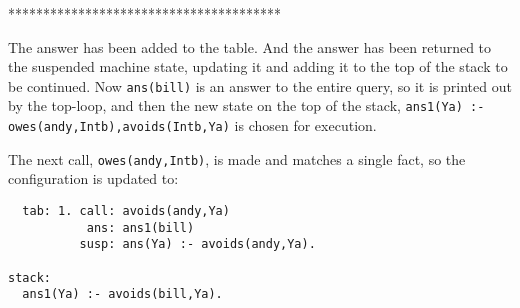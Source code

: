 ***************************************


The answer has been added to the table.  And the answer has been
returned to the suspended machine state, updating it and adding it to
the top of the stack to be continued.  Now \verb|ans(bill)| is an
answer to the entire query, so it is printed out by the top-loop, and
then the new state on the top of the stack,
\verb|ans1(Ya) :- owes(andy,Intb),avoids(Intb,Ya)|
is chosen for execution.

The next call, \verb|owes(andy,Intb)|, is made and matches a single
fact, so the configuration is updated to:
\begin{verbatim}
  tab: 1. call: avoids(andy,Ya)
           ans: ans1(bill)
          susp: ans(Ya) :- avoids(andy,Ya).

stack:
  ans1(Ya) :- avoids(bill,Ya).
\end{verbatim}

